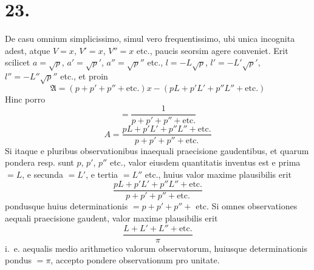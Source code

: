 \documentclass[12pt,a4paper]{book}
\begin{document}
\section*{23.}
\label{sec:art23}

De casu omnium simplicissimo, simul vero frequentissimo, ubi unica incognita adest, atque $V=x$, $V'=x$, $V''=x$ etc., paucis seorsim agere conveniet. Erit scilicet $a=\surd p$, $a'=\surd p'$, $a''=\surd p''$ etc., $l=-L\surd p$, $l'=-L'\surd p'$, $l''=-L''\surd p''$ etc., et proin
%
\begin{equation*}
\mathfrak{A}=(p+p'+p''+\text{etc.})x-(pL+p'L'+p''L''+\text{etc.})
\end{equation*}
Hinc porro
%
\begin{equation*}
[\alpha\alpha]=\frac{1}{p+p'+p''+\text{etc.}}
\end{equation*}
%
\begin{equation*}
A=\frac{pL+p'L'+p''L''+\text{etc.}}{p+p'+p''+\text{etc.}}
\end{equation*}
Si itaque e pluribus observationibus inaequali praecisione gaudentibus, et quarum pondera resp. sunt $p$, $p'$, $p''$ etc., valor eiusdem quantitatis inventus est e prima $=L$, e secunda $=L'$, e tertia $=L''$ etc., huius valor maxime plausibilis erit
%
\begin{equation*}
\frac{pL+p'L'+p''L''+\text{etc.}}{p+p'+p''+\text{etc.}}
\end{equation*}
pondusque huius determinationis $=p+p'+p''+$ etc. Si omnes observationes aequali praecisione gaudent, valor maxime plausibilis erit
%
\begin{equation*}
\frac{L+L'+L''+\text{etc.}}{\pi}
\end{equation*}
i.~e. aequalis medio arithmetico valorum observatorum, huiusque determinationis pondus $=\pi$, accepto pondere observationum pro unitate.
\end{document}
